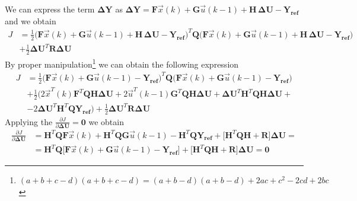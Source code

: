\documentclass[11pt,a4paper,oneside]{book}
\numberwithin{equation}{section}
\theoremstyle{it}
\theoremstyle{definition}
\begin{document}
We can express the term $\mathbf{\Delta Y}$ as $\mathbf{\Delta Y} = 
\mathbf{F}\vec{x}(k)+\mathbf{G}\vec{u}(k-1)+\mathbf{H}\,\mathbf{\Delta U} - 
\mathbf{Y_{ref}}$ and we obtain
\begin{equation}\label{eq20}
	\begin{aligned}
		J &= \frac{1}{2}\Big( 
		\mathbf{F}\vec{x}(k)+\mathbf{G}\vec{u}(k-1)+\mathbf{H}\,\mathbf{\Delta 
		U} - \mathbf{Y_{ref}}\Big) ^T\mathbf{Q}\Big( 
		\mathbf{F}\vec{x}(k)+\mathbf{G}\vec{u}(k-1)+\mathbf{H}\,\mathbf{\Delta 
		U} - \mathbf{Y_{ref}}\Big) \\[6pt]
		&+ \frac{1}{2} \mathbf{\Delta U}^T\mathbf{R}\mathbf{\Delta U}
	\end{aligned}
\end{equation}
By proper manipulation\footnote{$(a+b+c-d)(a+b+c-d) = 
(a+b-d)(a+b-d)+2ac+c^2-2cd+2bc$} we can obtain the following expression
\begin{equation}\label{eq21}
	\begin{aligned}
		J &= \frac{1}{2}\Big( \mathbf{F}\vec{x}(k)+\mathbf{G}\vec{u}(k-1) - 
		\mathbf{Y_{ref}}\Big) ^T\mathbf{Q}\Big( 
		\mathbf{F}\vec{x}(k)+\mathbf{G}\vec{u}(k-1) - \mathbf{Y_{ref}}\Big) 
		\\[6pt]
		&+ \frac{1}{2} \Big( 
		2\vec{x}^T(k)\mathbf{F}^T\mathbf{Q}\mathbf{H}\mathbf{\Delta U} + 
		2\vec{u}^T(k-1)\mathbf{G}^T\mathbf{Q}\mathbf{H}\mathbf{\Delta U} + 
		\mathbf{\Delta U}^T\mathbf{H}^T\mathbf{Q}\mathbf{H}\mathbf{\Delta U} + 
		\\[6pt]
		& - 2\mathbf{\Delta U}^T\mathbf{H}^T\mathbf{Q}\mathbf{Y_{ref}}\Big) + 
		\frac{1}{2} \mathbf{\Delta U}^T\mathbf{R}\mathbf{\Delta U}
	\end{aligned}
\end{equation}
Applying the $\frac{\partial J}{\partial \mathbf{\Delta U}} = \mathbf{0}$ we 
obtain
\begin{equation}\label{eq22}
	\begin{aligned}
		\frac{\partial J}{\partial  \mathbf{\Delta U}} &= 
		\mathbf{H}^T\mathbf{Q}\mathbf{F}\vec{x}(k)+\mathbf{H}^T\mathbf{Q}\mathbf{G}\vec{u}(k-1)-\mathbf{H}^T\mathbf{Q}\mathbf{Y_{ref}}+\Big[\mathbf{H}^T\mathbf{Q}\mathbf{H}
		 + \mathbf{R}\Big]\mathbf{\Delta U} = \\[6pt]
		& = \mathbf{H}^T\mathbf{Q}\Big[\mathbf{F}\vec{x}(k)+ 
		\mathbf{G}\vec{u}(k-1) - \mathbf{Y_{ref}}\Big] 
		+\Big[\mathbf{H}^T\mathbf{Q}\mathbf{H} + \mathbf{R}\Big]\mathbf{\Delta 
		U} = \mathbf{0}
	\end{aligned}
\end{equation}
\end{document}
